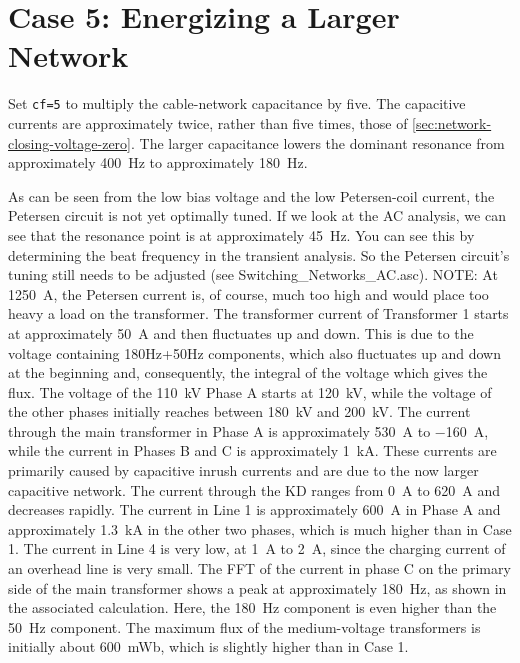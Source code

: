 

\section{Case 5: Energizing a Larger Network}
\label{sec:network-larger-capacitance}

Set \texttt{cf=5} to multiply the cable-network capacitance by five. The
capacitive currents are approximately twice, rather than five times, those of
\cref{sec:network-closing-voltage-zero}. The larger capacitance lowers the
dominant resonance from approximately \SI{400}{\hertz} to
approximately \SI{180}{\hertz}. 


As can be seen from the low bias voltage and the low Petersen-coil current, the Petersen circuit is not yet optimally tuned. If we look at the AC analysis, we can see that the resonance point is at approximately \SI{45}{\hertz}. You can see this by determining the beat frequency in the transient analysis. So the Petersen circuit’s tuning still needs to be adjusted (see Switching\_Networks\_AC.asc). NOTE: At \SI{1250}{\ampere}, the Petersen current is, of course, much too high and would place too heavy a load on the transformer. The transformer current of Transformer 1 starts at approximately \SI{50}{\ampere} and then fluctuates up and down. This is due to the voltage containing 180Hz+50Hz components, which also fluctuates up and down at the beginning and, consequently, the integral of the voltage which gives the flux. The voltage of the \SI{110}{\kilo\volt} Phase A starts at \SI{120}{\kilo\volt}, while the voltage of the other phases initially reaches between \SI{180}{\kilo\volt} and \SI{200}{\kilo\volt}. The current through the main transformer in Phase A is approximately \SI{530}{\ampere} to \SI{-160}{\ampere}, while the current in Phases B and C is approximately \SI{1}{\kilo\ampere}. These currents are primarily caused by capacitive inrush currents and are due to the now larger capacitive network. The current through the KD ranges from \SI{0}{\ampere} to \SI{620}{\ampere} and decreases rapidly. The current in Line 1 is approximately \SI{600}{\ampere} in Phase A and approximately \SI{1.3}{\kilo\ampere} in the other two phases, which is much higher than in Case 1.  The current in Line 4 is very low, at \SI{1}{\ampere} to \SI{2}{\ampere}, since the charging current of an overhead line is very small. The FFT of the current in phase C on the primary side of the main transformer shows a peak at approximately \SI{180}{\hertz}, as shown in the associated calculation. Here, the \SI{180}{\hertz} component is even higher than the \SI{50}{\hertz} component. 
The maximum flux of the medium-voltage transformers is initially about \SI{600}{\milli\weber}, which is slightly higher than in Case 1.
 



